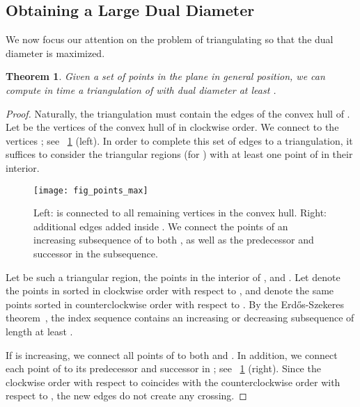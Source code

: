 \documentclass{article}
\newtheorem{theorem}{Theorem}[section]
\begin{document}
\subsection{Obtaining a Large Dual Diameter}\label{sec_max_point_set}

We now focus our attention on the problem of triangulating  so that the 
dual diameter is maximized. 


\begin{theorem}\label{theo_pointslargeDiam}
Given a set  of  points in the plane in general position, we can
compute in  time a triangulation
of  with dual diameter at least .
\end{theorem}
\begin{proof}
Naturally, the triangulation  must contain the edges of the convex hull of .
Let  be the vertices of the convex hull of  
in clockwise order.
We connect  to the vertices ; see 
\figurename~\ref{fig:fig_points_max} (left).
In order to complete this set of edges to a triangulation, it suffices to consider 
the triangular regions  (for ) 
with at least one point of  in their interior.

\begin{figure}[bt]
\centering
\texttt{[image: fig\_points\_max]}
\caption{Left:  is connected to all remaining vertices in the convex hull.
Right: additional edges added inside . We connect the points of an increasing subsequence of  to both ,  as well as the predecessor and successor in the subsequence.}
\label{fig:fig_points_max}
\end{figure}

Let  be such a triangular region,  
the points in the interior of , and .
Let  denote the points in  sorted in 
clockwise order with respect to , and  denote the same points sorted in counterclockwise order 
with respect to .
By the Erd\H{o}s-Szekeres theorem~\cite{es_subsequence}, the index sequence  
contains an increasing or decreasing subsequence  of length 
at least .

If  is increasing, we connect all points of  to 
both  and . In addition, we connect each point of  
to its predecessor and successor in ; see 
\figurename~\ref{fig:fig_points_max} (right). Since the 
clockwise order with respect to  coincides with 
the counterclockwise order with respect to , the 
new edges do not create any crossing.


\end{proof}
\end{document}
